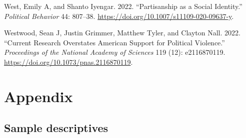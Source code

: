 \documentclass[
  12pt,
  a4paper,
  DIV=11,
  numbers=noendperiod]{scrartcl}
\newlength{\cslhangindent}
\newenvironment{CSLReferences}[2] %
 {\begin{list}{}{%
  \setlength{\itemindent}{0pt}
  \setlength{\leftmargin}{0pt}
  \setlength{\parsep}{0pt}
  \ifodd #1
   \setlength{\leftmargin}{\cslhangindent}
   \setlength{\itemindent}{-1\cslhangindent}
  \fi
  \setlength{\itemsep}{#2\baselineskip}}}
 {\end{list}}
\begin{document}
\begin{CSLReferences}{1}{0}
West, Emily A, and Shanto Iyengar. 2022. {``Partisanship as a Social
Identity.''} \emph{Political Behavior} 44: 807--38.
\url{https://doi.org/10.1007/s11109-020-09637-y}.

Westwood, Sean J, Justin Grimmer, Matthew Tyler, and Clayton Nall. 2022.
{``Current Research Overstates American Support for Political
Violence.''} \emph{Proceedings of the National Academy of Sciences} 119
(12): e2116870119. \url{https://doi.org/10.1073/pnas.2116870119}.

\end{CSLReferences}

\section{Appendix}\label{appendix}

\subsection{Sample descriptives}\label{sample-descriptives}
\end{document}
